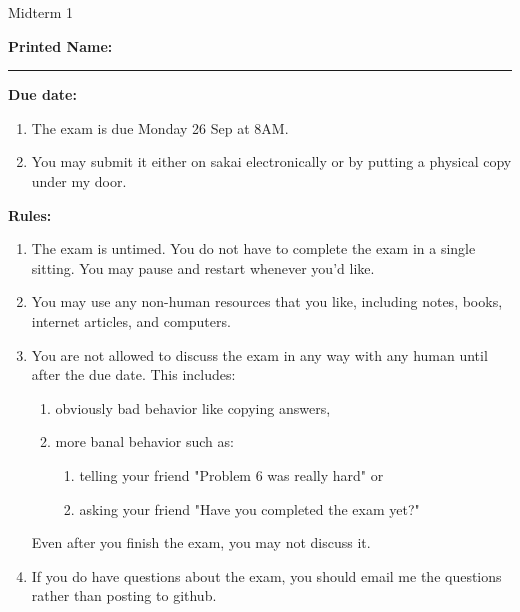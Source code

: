 \documentclass[10pt]{exam}
\theoremstyle{definition}
\begin{document}
\begin{center}
{
\Huge
    Midterm 1
}
\end{center}

\vspace{0.5in}
\noindent
\textbf{Printed Name:}

\noindent
\rule{\textwidth}{0.1pt}
\vspace{0.25in}

%
%
    \noindent
\textbf{Due date:}
\begin{enumerate}
    \item
        The exam is due Monday 26 Sep at 8AM.

    \item
        You may submit it either on sakai electronically or by putting a physical copy under my door.
\end{enumerate}

\vspace{0.15in}
\noindent
\textbf{Rules:}
\begin{enumerate}
    \item
        The exam is untimed.
        You do not have to complete the exam in a single sitting.
        You may pause and restart whenever you'd like.

    \item
    You may use any non-human resources that you like, including notes, books, internet articles, and computers.

    \item
    You are not allowed to discuss the exam in any way with any human until after the due date. This includes:
        \begin{enumerate}
            \item obviously bad behavior like copying answers, 
            \item more banal behavior such as:
                \begin{enumerate}
                    \item telling your friend "Problem 6 was really hard" or 
                    \item asking your friend "Have you completed the exam yet?"
                \end{enumerate}
        \end{enumerate}
        
        Even after you finish the exam, you may not discuss it.

    \item
    If you do have questions about the exam, you should email me the questions rather than posting to github.

\end{enumerate}
\end{document}
